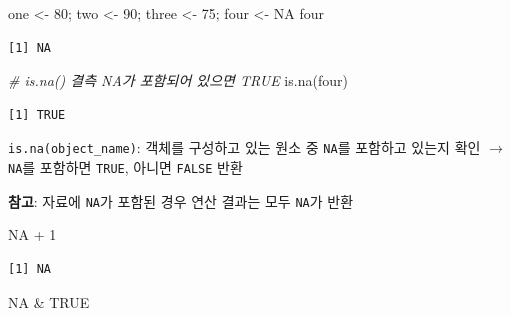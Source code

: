 \documentclass[
  11pt,
]{krantz}
\makeatletter
\newenvironment{Shaded}{\begin{snugshade}}{\end{snugshade}}
\newcommand{\CommentTok}[1]{\textcolor[rgb]{0.37,0.37,0.37}{\textit{#1}}}
\newcommand{\ConstantTok}[1]{\textcolor[rgb]{0,0,0}{#1}}
\newcommand{\DecValTok}[1]{\textcolor[rgb]{0.06,0.06,0.06}{#1}}
\newcommand{\FunctionTok}[1]{\textcolor[rgb]{0,0,0}{#1}}
\newcommand{\NormalTok}[1]{#1}
\newcommand{\OtherTok}[1]{\textcolor[rgb]{0.37,0.37,0.37}{#1}}
\newcommand{\SpecialCharTok}[1]{\textcolor[rgb]{0,0,0}{#1}}
\newenvironment{kframe}{%
\medskip{}
\setlength{\fboxsep}{.8em}
 \def\at@end@of@kframe{}%
 \ifinner\ifhmode%
  \def\at@end@of@kframe{\end{minipage}}%
  \begin{minipage}{\columnwidth}%
 \fi\fi%
 \def\FrameCommand##1{\hskip\@totalleftmargin \hskip-\fboxsep
 \colorbox{shadecolor}{##1}\hskip-\fboxsep
     \hskip-\linewidth \hskip-\@totalleftmargin \hskip\columnwidth}%
 \MakeFramed {\advance\hsize-\width
   \@totalleftmargin\z@ \linewidth\hsize
   \@setminipage}}%
 {\par\unskip\endMakeFramed%
 \at@end@of@kframe}
\newenvironment{rmdblock}[1]
  {
  \begin{itemize}
  \renewcommand{\labelitemi}{
    \raisebox{-.7\height}[0pt][0pt]{
      {\setkeys{Gin}{width=3em,keepaspectratio}\texttt{[image: images/\#1]}}
    }
  }
  \setlength{\fboxsep}{1em}
  \begin{kframe}
  \item
  }
  {
  \end{kframe}
  \end{itemize}
  }
\newenvironment{rmdtip}
  {\begin{rmdblock}{tip}}
  {\end{rmdblock}}
\makeatother
\begin{document}
\begin{Shaded}
\begin{Highlighting}[]
\NormalTok{one }\OtherTok{\textless{}{-}} \DecValTok{80}\NormalTok{; two }\OtherTok{\textless{}{-}} \DecValTok{90}\NormalTok{; three }\OtherTok{\textless{}{-}} \DecValTok{75}\NormalTok{; four }\OtherTok{\textless{}{-}} \ConstantTok{NA}
\NormalTok{four}
\end{Highlighting}
\end{Shaded}

\begin{verbatim}
[1] NA
\end{verbatim}

\begin{Shaded}
\begin{Highlighting}[]
\CommentTok{\# \textquotesingle{}is.na()\textquotesingle{} 결측 NA가 포함되어 있으면 TRUE }
\FunctionTok{is.na}\NormalTok{(four)}
\end{Highlighting}
\end{Shaded}

\begin{verbatim}
[1] TRUE
\end{verbatim}

\normalsize

\footnotesize

\begin{rmdtip}
\texttt{is.na(object\_name)}: 객체를 구성하고 있는 원소 중 \texttt{NA}를 포함하고 있는지 확인 \(\rightarrow\) \texttt{NA}를 포함하면 \texttt{TRUE}, 아니면 \texttt{FALSE} 반환

\textbf{참고}: 자료에 \texttt{NA}가 포함된 경우 연산 결과는 모두 \texttt{NA}가 반환
\end{rmdtip}

\normalsize

\footnotesize

\begin{Shaded}
\begin{Highlighting}[]
\ConstantTok{NA} \SpecialCharTok{+} \DecValTok{1}
\end{Highlighting}
\end{Shaded}

\begin{verbatim}
[1] NA
\end{verbatim}

\begin{Shaded}
\begin{Highlighting}[]
\ConstantTok{NA} \SpecialCharTok{\&} \ConstantTok{TRUE}
\end{Highlighting}
\end{Shaded}
\end{document}
